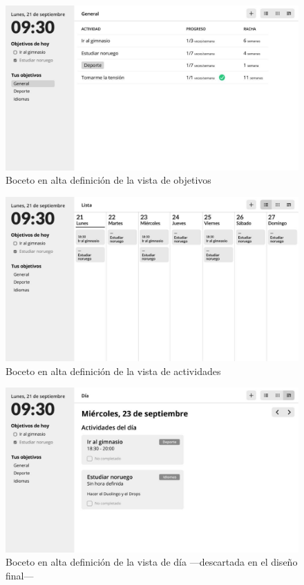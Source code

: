 \documentclass[10pt, a4paper]{aqademic}
\begin{document}
\begin{figure}[hbt!]
	\centering
	\includegraphics[scale=1.25]{img/sprint1-wireframe-objetivos.jpg}
	\caption{Boceto en alta definición de la vista de objetivos}
\end{figure}

\begin{figure}[hbt!]
	\centering
	\includegraphics[scale=1.25]{img/sprint1-wireframe-lista-actividades.jpg}
	\caption{Boceto en alta definición de la vista de actividades}
\end{figure}

\begin{figure}[hbt!]
	\centering
	\includegraphics[scale=1.25]{img/sprint1-wireframe-actividades.jpg}
	\caption{Boceto en alta definición de la vista de día ---descartada en el diseño final---}
\end{figure}
\end{document}
